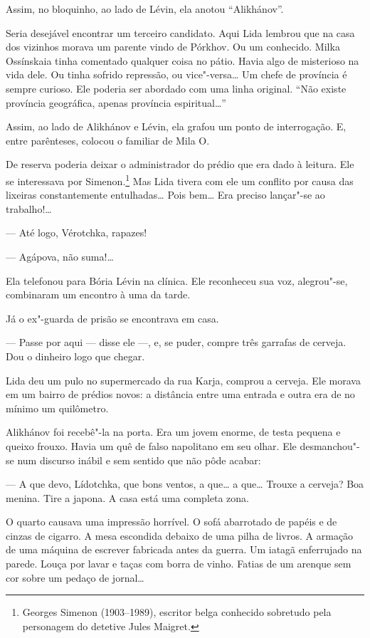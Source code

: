 Assim, no bloquinho, ao lado de Lévin, ela anotou ``Alikhánov''.

Seria desejável encontrar um terceiro candidato. Aqui Lida lembrou que
na casa dos vizinhos morava um parente vindo de Pórkhov. Ou um
conhecido. Milka Ossínskaia tinha comentado qualquer coisa no pátio.
Havia algo de misterioso na vida dele. Ou tinha sofrido repressão, ou
vice"-versa\ldots{} Um chefe de província é sempre curioso. Ele poderia ser
abordado com uma linha original. ``Não existe província geográfica,
apenas província espiritual\ldots{}''

Assim, ao lado de Alikhánov e Lévin, ela grafou um ponto de
interrogação. E, entre parênteses, colocou o familiar de Mila O.

De reserva poderia deixar o administrador do prédio que era dado à leitura. Ele
se interessava por Simenon.\footnote{Georges Simenon (1903--1989),
  escritor belga conhecido sobretudo pela personagem do detetive Jules
  Maigret.} Mas Lida tivera com ele um conflito por causa das lixeiras
constantemente entulhadas\ldots{} Pois bem\ldots{} Era preciso lançar"-se ao
trabalho!\ldots{}

--- Até logo, Vérotchka, rapazes!

--- Agápova, não suma!\ldots{}

Ela telefonou para Bória Lévin na clínica. Ele reconheceu sua voz,
alegrou"-se, combinaram um encontro à uma da tarde.

Já o ex"-guarda de prisão se encontrava em casa.

--- Passe por aqui --- disse ele ---, e, se puder, compre três garrafas
de cerveja. Dou o dinheiro logo que chegar.

Lida deu um pulo no supermercado da rua Karja, comprou a cerveja. Ele
morava em um bairro de prédios novos: a distância entre uma entrada e
outra era de no mínimo um quilômetro.

Alikhánov foi recebê"-la na porta. Era um jovem enorme, de testa pequena
e queixo frouxo. Havia um quê de falso napolitano em seu olhar. Ele
desmanchou"-se num discurso inábil e sem sentido que não pôde acabar:

--- A que devo, Lídotchka, que bons ventos, a que\ldots{} a que\ldots{} Trouxe
a cerveja? Boa menina. Tire a japona. A casa está uma completa zona.

O quarto causava uma impressão horrível. O sofá abarrotado de papéis e
de cinzas de cigarro. A mesa escondida debaixo de uma pilha de
livros. A armação de uma máquina de escrever fabricada antes da guerra.
Um iatagã enferrujado na parede. Louça por lavar e taças com borra de
vinho. Fatias de um arenque sem cor sobre um pedaço de jornal\ldots{}

